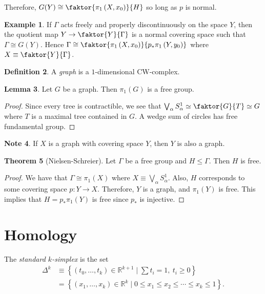 \documentclass[10pt,letterpaper,cm]{nupset}
\theoremstyle{definition}
\newtheorem{definition}{Definition}[subsection]
\newtheorem{exmp}[definition]{Example}
\newtheorem{note}[definition]{Note}
\theoremstyle{theorem}
\newtheorem{theorem}[definition]{Theorem}
\newtheorem{lemma}[definition]{Lemma}
\theoremstyle{remark}
\newcommand{\R}{\mathbb{R}}
\newcommand{\1}{\mathbb{1}}
\newcommand{\0}{\vec 0}
\begin{document}
Therefore, $G(Y) \cong \faktor{\pi_1\left(X, x_0\right)}{H}$ so long as $p$ is normal.

\begin{exmp}
If $\Gamma$ acts freely and properly discontinuously on the space $Y$, then the quotient map $Y \to \faktor{Y}{\Gamma}$ is a normal covering space such that $\Gamma \cong G(Y)$. Hence $\Gamma \cong \faktor{\pi_1\left(X, x_0\right)}{p_{\ast}\pi_1\left(Y, y_0\right)}$ where $X\equiv  \faktor{Y}{\Gamma}$.
\end{exmp}

\begin{definition}
A \textit{graph} is a $1$-dimensional CW-complex. 
\end{definition}

\begin{lemma}
Let $G$ be a graph.  Then $\pi_1(G)$ is a free group.
\end{lemma}
\begin{proof}
Since every tree is contractible, we see that $\bigvee_{\alpha} S_{\alpha}^1 \simeq \faktor{G}{T}\simeq G$ where $T$ is a maximal tree contained in $G$. A wedge sum of circles has free fundamental group.
\end{proof}

\begin{note}
If $X$ is a graph with covering space $Y$, then $Y$ is also a graph. 
\end{note}

\begin{theorem}[Nielsen-Schreier]
Let $\Gamma$ be a free group and $H\leq \Gamma$. Then $H$ is free. 
\end{theorem}
\begin{proof}
We have that $\Gamma \cong \pi_1(X)$ where $X\equiv  \bigvee_{\alpha} S_{\alpha}^1$. Also, $H$ corresponds to some covering space $p: Y \to X$. Therefore, $Y$ is a graph, and $\pi_1(Y)$ is free. This implies that $H= p_{\ast}\pi_1(Y)$ is free since $p_{\ast}$ is injective. 
\end{proof}

\section{Homology} 

The \textit{standard $k$-simplex} is the set 
\begin{align*}
  \Delta^k &  \equiv \left\{\left(t_0, \ldots, t_k\right) \in \R^{k+1} \mid \sum t_i = 1, \ t_i \geq 0 \right\} 
  \\ & = \left\{\left(x_1, \ldots, x_k\right) \in \R^k \mid 0\leq x_1 \leq x_2 \leq \cdots \leq x_k \leq 1 \right\} .
 \end{align*}
\end{document}
